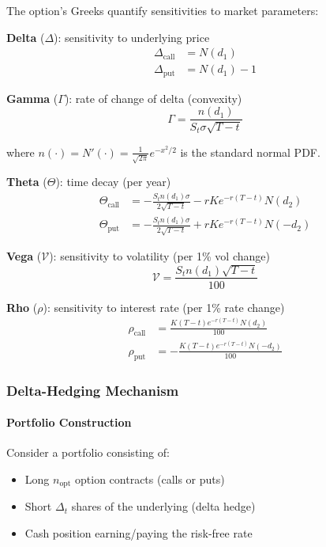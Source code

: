 The option's Greeks quantify sensitivities to market parameters:

\textbf{Delta} ($\Delta$): sensitivity to underlying price
\begin{align*}
\Delta_{\text{call}} &= N(d_1) \\
\Delta_{\text{put}} &= N(d_1) - 1
\end{align*}

\textbf{Gamma} ($\Gamma$): rate of change of delta (convexity)
\[
\Gamma = \frac{n(d_1)}{S_t \sigma \sqrt{T - t}}
\]

where $n(\cdot) = N'(\cdot) = \frac{1}{\sqrt{2\pi}} e^{-x^2/2}$ is the standard normal PDF.

\textbf{Theta} ($\Theta$): time decay (per year)
\begin{align*}
\Theta_{\text{call}} &= -\frac{S_t n(d_1) \sigma}{2\sqrt{T-t}} - rK e^{-r(T-t)} N(d_2) \\
\Theta_{\text{put}} &= -\frac{S_t n(d_1) \sigma}{2\sqrt{T-t}} + rK e^{-r(T-t)} N(-d_2)
\end{align*}

\textbf{Vega} ($\mathcal{V}$): sensitivity to volatility (per 1\% vol change)
\[
\mathcal{V} = \frac{S_t n(d_1) \sqrt{T-t}}{100}
\]

\textbf{Rho} ($\rho$): sensitivity to interest rate (per 1\% rate change)
\begin{align*}
\rho_{\text{call}} &= \frac{K(T-t) e^{-r(T-t)} N(d_2)}{100} \\
\rho_{\text{put}} &= -\frac{K(T-t) e^{-r(T-t)} N(-d_2)}{100}
\end{align*}

\subsubsection{Delta-Hedging Mechanism}

\paragraph{Portfolio Construction}

Consider a portfolio consisting of:
\begin{itemize}
  \item Long $n_{\text{opt}}$ option contracts (calls or puts)
  \item Short $\Delta_t$ shares of the underlying (delta hedge)
  \item Cash position earning/paying the risk-free rate
\end{itemize}

